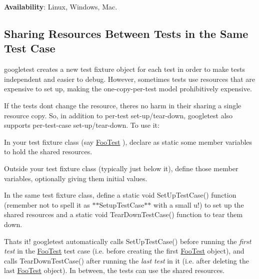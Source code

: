 {\bfseries Availability}\+: Linux, Windows, Mac.

\subsection*{Sharing Resources Between Tests in the Same Test Case}

googletest creates a new test fixture object for each test in order to make tests independent and easier to debug. However, sometimes tests use resources that are expensive to set up, making the one-\/copy-\/per-\/test model prohibitively expensive.

If the tests don\textquotesingle{}t change the resource, there\textquotesingle{}s no harm in their sharing a single resource copy. So, in addition to per-\/test set-\/up/tear-\/down, googletest also supports per-\/test-\/case set-\/up/tear-\/down. To use it\+:


\begin{DoxyEnumerate}
\item In your test fixture class (say {\ttfamily \hyperlink{classFooTest}{Foo\+Test}} ), declare as {\ttfamily static} some member variables to hold the shared resources.
\end{DoxyEnumerate}
\begin{DoxyEnumerate}
\item Outside your test fixture class (typically just below it), define those member variables, optionally giving them initial values.
\end{DoxyEnumerate}
\begin{DoxyEnumerate}
\item In the same test fixture class, define a {\ttfamily static void Set\+Up\+Test\+Case()} function (remember not to spell it as $\ast$$\ast${\ttfamily Setup\+Test\+Case}$\ast$$\ast$ with a small {\ttfamily u}!) to set up the shared resources and a {\ttfamily static void Tear\+Down\+Test\+Case()} function to tear them down.
\end{DoxyEnumerate}

That\textquotesingle{}s it! googletest automatically calls {\ttfamily Set\+Up\+Test\+Case()} before running the {\itshape first test} in the {\ttfamily \hyperlink{classFooTest}{Foo\+Test}} test case (i.\+e. before creating the first {\ttfamily \hyperlink{classFooTest}{Foo\+Test}} object), and calls {\ttfamily Tear\+Down\+Test\+Case()} after running the {\itshape last test} in it (i.\+e. after deleting the last {\ttfamily \hyperlink{classFooTest}{Foo\+Test}} object). In between, the tests can use the shared resources.

